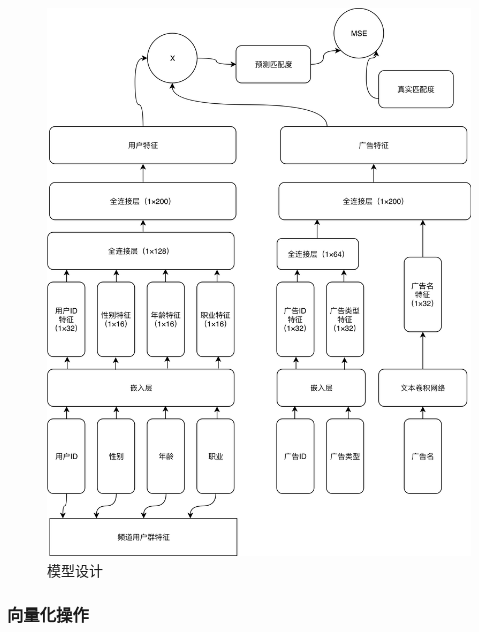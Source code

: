 \begin{figure}[H]
    \centering
    \includegraphics[scale=0.18]
        {resources/Advertisement.png}
    \caption{模型设计}
\end{figure}

\subsubsection{向量化操作}

